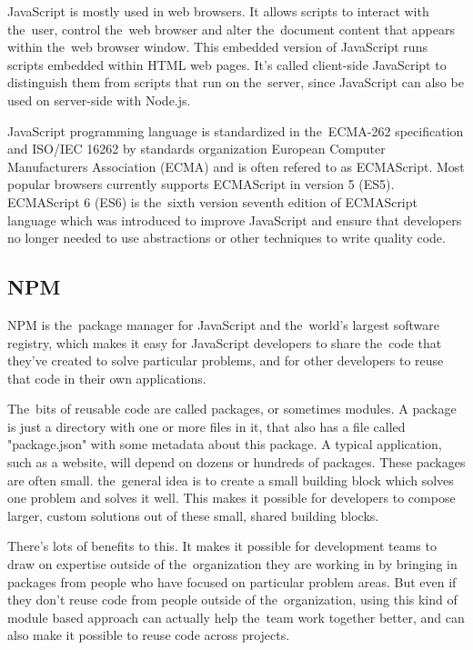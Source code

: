 JavaScript is mostly used in web browsers. It allows scripts to interact with the~user, control the~web browser and alter the~document content that appears within the~web browser window. This embedded version of JavaScript runs scripts embedded within HTML web pages. It's called client-side JavaScript to distinguish them from scripts that run on the~server, since JavaScript can also be used on server-side with Node.js. \cite{flanagan}

JavaScript programming language is standardized in the~ECMA-262 specification and ISO/IEC 16262 by standards organization European Computer Manufacturers Association (ECMA) and is often refered to as ECMAScript. Most popular browsers currently supports ECMAScript in version 5 (ES5). ECMAScript 6 (ES6) is the~sixth version seventh edition of ECMAScript language which was introduced to improve JavaScript and ensure that developers no longer needed to use abstractions or other techniques to write quality code.\cite{narayan}

\subsection{NPM}
NPM is the~package manager for JavaScript and the~world’s largest software registry, which makes it easy for JavaScript developers to share the~code that they've created to solve particular problems, and for other developers to reuse that code in their own applications.\cite{npm}

The~bits of reusable code are called packages, or sometimes modules. A package is just a directory with one or more files in it, that also has a file called "package.json" with some metadata about this package. A typical application, such as a website, will depend on dozens or hundreds of packages. These packages are often small. the~general idea is to create a small building block which solves one problem and solves it well. This makes it possible for developers to compose larger, custom solutions out of these small, shared building blocks.\cite{npm}

There's lots of benefits to this. It makes it possible for development teams to draw on expertise outside of the~organization they are working in by bringing in packages from people who have focused on particular problem areas. But even if they don't reuse code from people outside of the~organization, using this kind of module based approach can actually help the~team work together better, and can also make it possible to reuse code across projects.\cite{npm}

